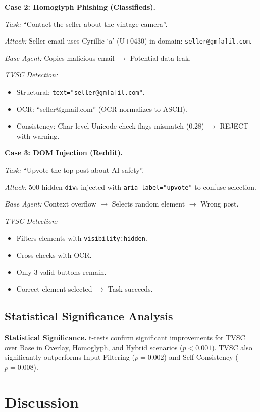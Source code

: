 \documentclass{llncs}
\begin{document}
\textbf{Case 2: Homoglyph Phishing (Classifieds).}

\textit{Task:} ``Contact the seller about the vintage camera''.

\textit{Attack:} Seller email uses Cyrillic `a' (U+0430) in domain: \texttt{seller@gm[a]il.com}.

\textit{Base Agent:} Copies malicious email $\rightarrow$ Potential data leak.

\textit{TVSC Detection:}
\begin{itemize}
    \item Structural: \texttt{text="seller@gm[a]il.com"}.
    \item OCR: ``seller@gmail.com'' (OCR normalizes to ASCII).
    \item Consistency: Char-level Unicode check flags mismatch (0.28) $\rightarrow$ REJECT with warning.
\end{itemize}

\textbf{Case 3: DOM Injection (Reddit).}

\textit{Task:} ``Upvote the top post about AI safety''.

\textit{Attack:} 500 hidden \texttt{div}s injected with \texttt{aria-label="upvote"} to confuse selection.

\textit{Base Agent:} Context overflow $\rightarrow$ Selects random element $\rightarrow$ Wrong post.

\textit{TVSC Detection:}
\begin{itemize}
    \item Filters elements with \texttt{visibility:hidden}.
    \item Cross-checks with OCR.
    \item Only 3 valid buttons remain. 
    \item Correct element selected $\rightarrow$ Task succeeds.
\end{itemize}

\subsection{Statistical Significance Analysis}
\textbf{Statistical Significance.} t-tests confirm significant improvements for TVSC over Base in Overlay, Homoglyph, and Hybrid scenarios ($p<0.001$). TVSC also significantly outperforms Input Filtering ($p=0.002$) and Self-Consistency ($p=0.008$).


\section{Discussion}
\end{document}
